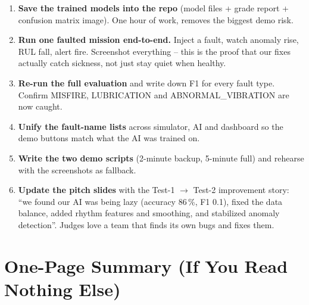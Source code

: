 \documentclass[11pt]{article}
\begin{document}
\begin{enumerate}
  \item \textbf{Save the trained models into the repo} (model files +
        grade report + confusion matrix image). One hour of work, removes
        the biggest demo risk.
  \item \textbf{Run one faulted mission end-to-end.} Inject a fault, watch
        anomaly rise, RUL fall, alert fire. Screenshot everything -- this
        is the proof that our fixes actually catch sickness, not just stay
        quiet when healthy.
  \item \textbf{Re-run the full evaluation} and write down F1 for every
        fault type. Confirm MISFIRE, LUBRICATION and ABNORMAL\_VIBRATION
        are now caught.
  \item \textbf{Unify the fault-name lists} across simulator, AI and
        dashboard so the demo buttons match what the AI was trained on.
  \item \textbf{Write the two demo scripts} (2-minute backup, 5-minute
        full) and rehearse with the screenshots as fallback.
  \item \textbf{Update the pitch slides} with the Test-1 $\rightarrow$
        Test-2 improvement story: ``we found our AI was being lazy
        (accuracy 86\,\%, F1 0.1), fixed the data balance, added rhythm
        features and smoothing, and stabilized anomaly detection''.
        Judges love a team that finds its own bugs and fixes them.
\end{enumerate}

\section{One-Page Summary (If You Read Nothing Else)}
\end{document}
